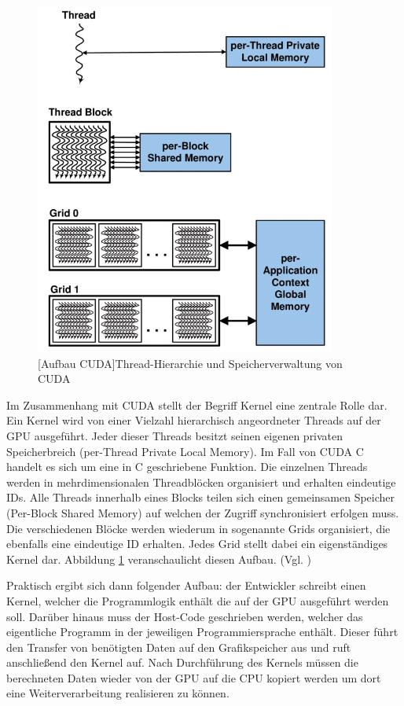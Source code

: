 \documentclass[times, 10pt,twocolumn]{article}
\begin{document}
 \begin{figure}[!ht]
	\centering
	\includegraphics[width=0.7\linewidth]{image/cuda.png}
	[Aufbau CUDA]{Thread-Hierarchie und Speicherverwaltung von CUDA \cite{CUDA.2015}}
	\label{fig:cudaAufbau}
\end{figure}

Im Zusammenhang mit CUDA stellt der Begriff Kernel eine zentrale Rolle dar. Ein Kernel wird von einer Vielzahl hierarchisch angeordneter Threads auf der GPU ausgeführt. Jeder dieser Threads besitzt seinen eigenen privaten Speicherbreich (per-Thread Private Local Memory). Im Fall von CUDA C handelt es sich um eine in C geschriebene Funktion. Die einzelnen Threads werden in mehrdimensionalen Threadblöcken organisiert und erhalten eindeutige IDs. Alle Threads innerhalb eines Blocks teilen sich einen gemeinsamen Speicher (Per-Block Shared Memory) auf welchen der Zugriff synchronisiert erfolgen muss. Die verschiedenen Blöcke werden wiederum in sogenannte Grids  organisiert, die ebenfalls eine eindeutige ID erhalten. Jedes Grid stellt dabei ein eigenständiges Kernel dar. Abbildung \ref{fig:cudaAufbau} veranschaulicht diesen Aufbau. (Vgl. \cite{CUDA.2015})

Praktisch ergibt sich dann folgender Aufbau: der Entwickler schreibt einen Kernel, welcher die Programmlogik enthält die auf der GPU ausgeführt werden soll. Darüber hinaus muss der Host-Code geschrieben werden, welcher das eigentliche Programm in der jeweiligen Programmiersprache enthält. Dieser führt den Transfer von benötigten Daten auf den Grafikspeicher aus und ruft anschließend den Kernel auf. Nach Durchführung des Kernels müssen die berechneten Daten wieder von der GPU auf die CPU kopiert werden um dort eine Weiterverarbeitung realisieren zu können.
\end{document}
